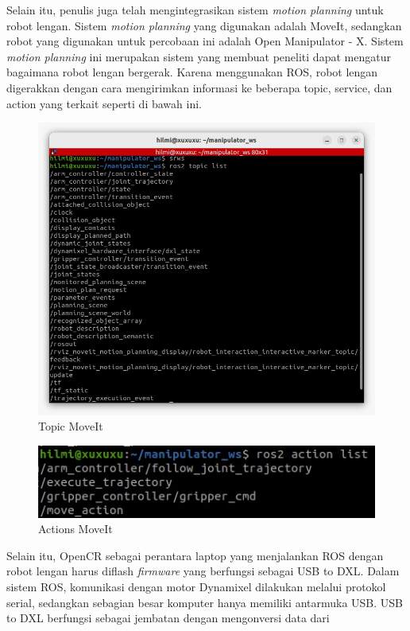 Selain itu, penulis juga telah mengintegrasikan sistem \emph{motion planning} untuk robot lengan. Sistem \emph{motion planning} yang digunakan adalah MoveIt,
sedangkan robot yang digunakan untuk percobaan ini adalah Open Manipulator - X. Sistem \emph{motion planning} ini merupakan sistem yang membuat
peneliti dapat mengatur bagaimana robot lengan bergerak. Karena menggunakan ROS, robot lengan digerakkan dengan cara mengirimkan informasi
ke beberapa topic, service, dan action yang terkait seperti di bawah ini.
\begin{figure} [H] \centering
    \includegraphics[scale=0.3]{gambar/moveit topic.jpeg}
    \caption{Topic MoveIt}
    \label{fig:moveit_topic}
  \end{figure}
\begin{figure} [H] \centering
    \includegraphics[scale=0.5]{gambar/moveit actions.jpeg}
    \caption{Actions MoveIt}
    \label{fig:moveit_actions}
\end{figure}
Selain itu, OpenCR sebagai perantara laptop yang menjalankan ROS dengan robot lengan harus diflash \emph{firmware} yang berfungsi sebagai
USB to DXL. Dalam sistem ROS, komunikasi dengan motor Dynamixel dilakukan melalui protokol serial,
sedangkan sebagian besar komputer hanya memiliki antarmuka USB. USB to DXL berfungsi sebagai jembatan dengan mengonversi data dari
